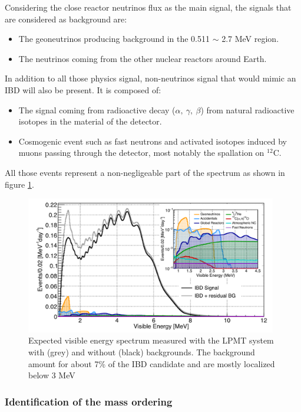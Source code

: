 Considering the close reactor neutrinos flux as the main signal, the signals that are considered as background are:
\begin{itemize}
  \item The geoneutrinos producing background in the 0.511 $\sim$ 2.7 MeV region.
  \item The neutrinos coming from the other nuclear reactors around Earth.
\end{itemize}
In addition to all those physics signal, non-neutrinos signal that would mimic an IBD will also be present. It is composed of:
\begin{itemize}
  \item The signal coming from radioactive decay ($\alpha, ~ \gamma, ~ \beta$) from natural radioactive isotopes in the material of the detector.
  \item Cosmogenic event such as fast neutrons and activated isotopes induced by muons passing through the detector, most notably the spallation on $^{12}$C.
\end{itemize}
All those events represent a non-negligeable part of the spectrum as shown in figure \ref{fig:juno:spectrum_with_background}.

\begin{figure}[ht]
  \centering
  \includegraphics[height=6cm]{images/juno/spectrum_with_background.png}
  \caption{Expected visible energy spectrum measured with the LPMT system with (grey) and without (black) backgrounds. The background amount for about 7\% of the IBD candidate and are mostly localized below 3 MeV \cite{juno_collaboration_sub-percent_2022}}
  \label{fig:juno:spectrum_with_background}
\end{figure}


\subsubsection{Identification of the mass ordering}

